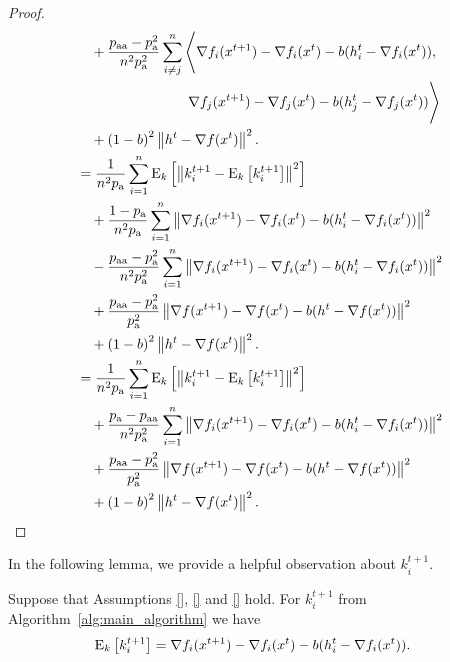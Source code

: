 \documentclass{article}
\begin{document}
\begin{proof}
\begin{align*}
    &\quad +\frac{p_{\textnormal{aa}} - p_{\textnormal{a}}^2}{n^2 p_{\textnormal{a}}^2}\sum_{i \neq j}^n\Bigg\langle \nabla f_i(x^{t+1}) - \nabla f_i(x^{t}) - b(h^t_i - \nabla f_i(x^{t})), \\
    &\qquad\qquad\qquad\qquad \nabla f_j(x^{t+1}) - \nabla f_j(x^{t}) - b(h^t_j - \nabla f_j(x^{t}))\Bigg\rangle \\
    &\quad + \left(1 - b\right)^2 \left\| h^{t} - \nabla f(x^{t}) \right\|^2. \\
    &=\frac{1}{n^2 p_{\textnormal{a}}}\sum_{i=1}^n {\rm E}_{k}\left[\left\| k^{t+1}_i - {\rm E}_{k}\left[k^{t+1}_i\right] \right\|^2\right] \\
    &\quad + \frac{1 - p_{\textnormal{a}}}{n^2 p_{\textnormal{a}}}\sum_{i=1}^n \left\| \nabla f_i(x^{t+1}) - \nabla f_i(x^{t}) - b(h^t_i - \nabla f_i(x^{t})) \right\|^2 \\
    &\quad - \frac{p_{\textnormal{aa}} - p_{\textnormal{a}}^2}{n^2 p_{\textnormal{a}}^2} \sum_{i=1}^n \left\| \nabla f_i(x^{t+1}) - \nabla f_i(x^{t}) - b(h^t_i - \nabla f_i(x^{t})) \right\|^2 \\
    &\quad + \frac{p_{\textnormal{aa}} - p_{\textnormal{a}}^2}{p_{\textnormal{a}}^2} \left\| \nabla f(x^{t+1}) - \nabla f(x^{t}) - b(h^t - \nabla f(x^{t})) \right\|^2 \\
    &\quad + \left(1 - b\right)^2 \left\| h^{t} - \nabla f(x^{t}) \right\|^2. \\
    &=\frac{1}{n^2 p_{\textnormal{a}}}\sum_{i=1}^n {\rm E}_{k}\left[\left\| k^{t+1}_i - {\rm E}_{k}\left[k^{t+1}_i\right] \right\|^2\right] \\
    &\quad + \frac{p_{\textnormal{a}} - p_{\textnormal{aa}}}{n^2 p_{\textnormal{a}}^2} \sum_{i=1}^n \left\| \nabla f_i(x^{t+1}) - \nabla f_i(x^{t}) - b(h^t_i - \nabla f_i(x^{t})) \right\|^2 \\
    &\quad + \frac{p_{\textnormal{aa}} - p_{\textnormal{a}}^2}{p_{\textnormal{a}}^2} \left\| \nabla f(x^{t+1}) - \nabla f(x^{t}) - b(h^t - \nabla f(x^{t})) \right\|^2 \\
    &\quad + \left(1 - b\right)^2 \left\| h^{t} - \nabla f(x^{t}) \right\|^2. \\
  \end{align*}
\end{proof}

In the following lemma, we provide a helpful observation about $k^{t+1}_i$.

\begin{lemma}
  \label{lemma:expectation_k_t}
  Suppose that Assumptions \ref{}, \ref{} and \ref{} hold. For $k^{t+1}_i$ from Algorithm~\ref{alg:main_algorithm} we have
  \begin{align*}
      &{\rm E}_{k}\left[k^{t+1}_i\right] = \nabla f_i(x^{t+1}) - \nabla f_i(x^{t}) - b(h^t_i - \nabla f_i(x^{t})).
  \end{align*}
\end{lemma}
\end{document}
